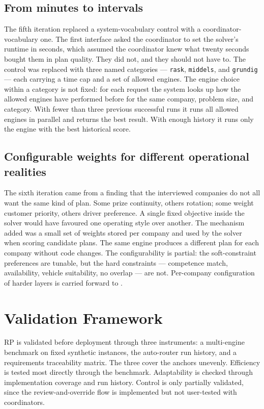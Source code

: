 \subsection{From minutes to intervals}
\label{sec:plan-time-intervals}

The fifth iteration replaced a system-vocabulary control with a coordinator-vocabulary one. The first interface asked the coordinator to set the solver's runtime in seconds, which assumed the coordinator knew what twenty seconds bought them in plan quality. They did not, and they should not have to. The control was replaced with three named categories --- \texttt{rask}, \texttt{middels}, and \texttt{grundig} --- each carrying a time cap and a set of allowed engines. The engine choice within a category is not fixed: for each request the system looks up how the allowed engines have performed before for the same company, problem size, and category. With fewer than three previous successful runs it runs all allowed engines in parallel and returns the best result. With enough history it runs only the engine with the best historical score.

\subsection{Configurable weights for different operational realities}
\label{sec:configurable-weights}

The sixth iteration came from a finding that the interviewed companies do not all want the same kind of plan. Some prize continuity, others rotation; some weight customer priority, others driver preference. A single fixed objective inside the solver would have favoured one operating style over another. The mechanism added was a small set of weights stored per company and used by the solver when scoring candidate plans. The same engine produces a different plan for each company without code changes. The configurability is partial: the soft-constraint preferences are tunable, but the hard constraints --- competence match, availability, vehicle suitability, no overlap --- are not. Per-company configuration of harder layers is carried forward to .

\section{Validation Framework}
\label{sec:evaluation-framework}

RP is validated before deployment through three instruments: a multi-engine benchmark on fixed synthetic instances, the auto-router run history, and a requirements traceability matrix. The three cover the anchors unevenly. Efficiency is tested most directly through the benchmark. Adaptability is checked through implementation coverage and run history. Control is only partially validated, since the review-and-override flow is implemented but not user-tested with coordinators.

